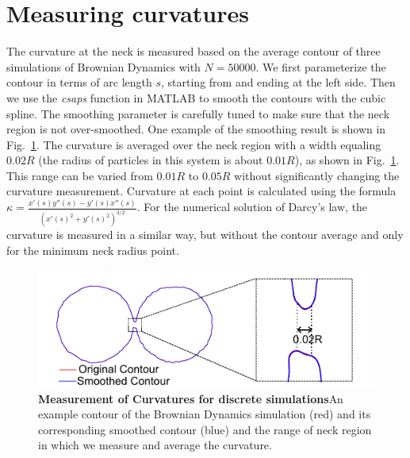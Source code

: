 \documentclass[%
reprint,
amsmath,amssymb,
aps,
]{revtex4-2}
\begin{document}
	\section{Measuring curvatures}
	The curvature at the neck is measured based on the average contour of three simulations of Brownian Dynamics with $N=50000$. We first parameterize the contour in terms of arc length $s$, starting from and ending at the left side. Then we use the \textit{csaps} function in MATLAB to smooth the contours with the cubic spline. The smoothing parameter is carefully tuned to make sure that the neck region is not over-smoothed. One example of the smoothing result is shown in Fig.~\ref{fig:measurecurvature}. The curvature is averaged over the neck region with a width equaling $0.02R$ (the radius of particles in this system is about $0.01R$), as shown in Fig.~\ref{fig:measurecurvature}. This range can be varied from $0.01R$ to $0.05R$ without significantly changing the curvature measurement. Curvature at each point is calculated using the formula $\kappa = \frac{x'(s)y''(s)-y'(s)x''(s)}{(x'(s)^2+y'(s)^2)^{3/2}}$. For the numerical solution of Darcy's law, the curvature is measured in a similar way, but without the contour average and only for the minimum neck radius point. 
	\begin{figure}[ht]
		\centering
		\includegraphics[width=\columnwidth]{Fig_sup3.pdf}
		\caption{\textbf{Measurement of Curvatures for discrete simulations}An example contour of the Brownian Dynamics simulation (red) and its corresponding smoothed contour (blue) and the range of neck region in which we measure and average the curvature.}
		\label{fig:measurecurvature}
	\end{figure}
	
	
	
\end{document}

